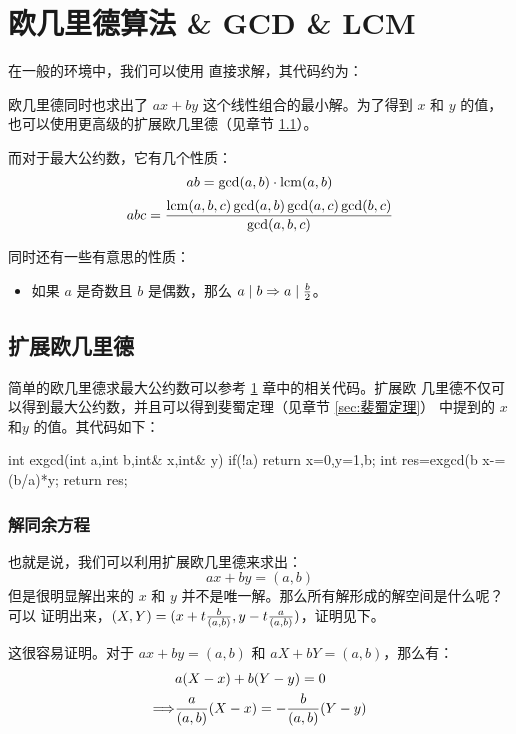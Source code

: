 \section{欧几里德算法 \& GCD \& LCM}
\label{sec:欧几里德算法}

在一般的环境中，我们可以使用  直接求解，其代码约为：

欧几里德同时也求出了 $ax + by$ 这个线性组合的最小解。为了得到 $x$ 和 $y$ 的值，
也可以使用更高级的扩展欧几里德（见章节 \ref{sec:扩展欧几里德}）。

而对于最大公约数，它有几个性质：\[
    ab = \gcd(a, b) \cdot \mathrm{lcm}(a, b)
\] \[
    abc = {\mathrm{lcm}(a, b, c) \gcd(a, b) \gcd(a, c) \gcd(b, c) \over \gcd(a, b, c)}
\]

同时还有一些有意思的性质：
\begin{itemize}
    \item 如果 $a$ 是奇数且 $b$ 是偶数，那么 $a \mid b \Rightarrow a \mid {b
        \over 2}$。
\end{itemize}



\subsection{扩展欧几里德}
\label{sec:扩展欧几里德}\label{subsec:扩展欧几里德}

简单的欧几里德求最大公约数可以参考 \ref{sec:欧几里德算法} 章中的相关代码。扩展欧
几里德不仅可以得到最大公约数，并且可以得到斐蜀定理（见章节 \ref{sec:裴蜀定理}）
中提到的 $x$ 和$y$ 的值。其代码如下：
\begin{Cpp}
int exgcd(int a,int b,int& x,int& y){
  if(!a) return x=0,y=1,b;
  int res=exgcd(b%
  x-=(b/a)*y;
  return res;
}
\end{Cpp}



\subsubsection{解同余方程}

也就是说，我们可以利用扩展欧几里德来求出：\[
    ax + by = (a,  b)
\]
但是很明显解出来的 $x$ 和 $y$ 并不是唯一解。那么所有解形成的解空间是什么呢？可以
证明出来，$(X, Y) = (x + t {b \over (a, b)}, y - t {a \over (a, b)})$，证明见下。

这很容易证明。对于 $ax + by = (a, b)$ 和 $aX + bY = (a, b)$，那么有：\[
    \begin{aligned}
    & a(X - x) + b(Y - y) = 0 \\
    \Longrightarrow & {a \over (a, b)} (X - x) = - {b \over (a, b)} (Y - y)
    \end{aligned}
\]

